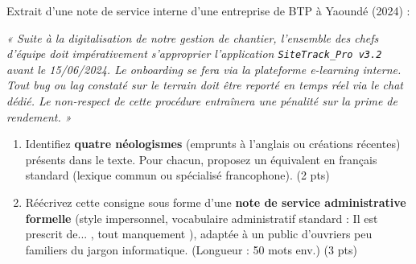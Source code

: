 \documentclass[11pt]{article}
\begin{document}
\begin{exercice}
\label{exo:neologie}
Extrait d'une note de service interne d'une entreprise de BTP à Yaoundé (2024) :

\textit{« Suite à la digitalisation de notre gestion de chantier, l'ensemble des chefs d'équipe doit impérativement s'approprier l'application \texttt{SiteTrack\_Pro v3.2} avant le 15/06/2024. Le \textit{onboarding} se fera via la plateforme \textit{e-learning} interne. Tout \textit{bug} ou \textit{lag} constaté sur le terrain doit être \textit{reporté} en temps réel via le \textit{chat} dédié. Le non-respect de cette procédure entraînera une pénalité sur la prime de rendement. »}

\begin{enumerate}
    \item Identifiez \textbf{quatre néologismes} (emprunts à l'anglais ou créations récentes) présents dans le texte. Pour chacun, proposez un équivalent en français standard (lexique commun ou spécialisé francophone). (2 pts)
    \item Réécrivez cette consigne sous forme d'une \textbf{note de service administrative formelle} (style impersonnel, vocabulaire administratif standard : \og Il est prescrit de... \fg{}, \og tout manquement \fg{}), adaptée à un public d'ouvriers peu familiers du jargon informatique. (Longueur : 50 mots env.) (3 pts)
\end{enumerate}
\end{exercice}
\end{document}
